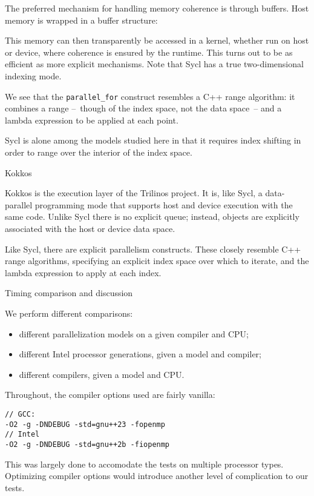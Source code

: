 The preferred mechanism for handling memory coherence is through buffers.
Host memory is wrapped in a buffer structure:

This memory can then transparently be accessed in a kernel,
whether run on host or device,
where coherence is ensured by the runtime.
This turns out to be as efficient as more explicit mechanisms.
%
%
Note that Sycl has a true two-dimensional indexing mode.

We see that the \lstinline{parallel_for} construct
resembles a C++ range algorithm: it combines
a range --~though of the index space, not the data space~--
and a lambda expression to be applied at each point.

Sycl is alone among the models studied here
in that it requires index shifting 
in order to range over the interior of the index space.

 {Kokkos}

Kokkos is the execution layer of the Trilinos project.
It is, like Sycl, a data-parallel programming mode
that supports host and device execution with the same code.
Unlike Sycl there is no explicit queue; instead,
objects are explicitly associated with the host or device data space.


Like Sycl, there are explicit parallelism constructs.
These closely resemble C++ range algorithms,
specifying an explicit index space over which to iterate,
and the lambda expression to apply at each index.


 {Timing comparison and discussion}

We perform different comparisons:
\begin{itemize}
\item different parallelization models on a given compiler and CPU;
\item different Intel processor generations, given a model and compiler;
\item different compilers, given a model and CPU.
\end{itemize}
Throughout, the compiler options used are fairly vanilla:
\begin{verbatim}
// GCC:
-O2 -g -DNDEBUG -std=gnu++23 -fopenmp
// Intel
-O2 -g -DNDEBUG -std=gnu++2b -fiopenmp
\end{verbatim}
This was largely done to accomodate the tests
on multiple processor types.
Optimizing compiler options would introduce
another level of complication to our tests.

